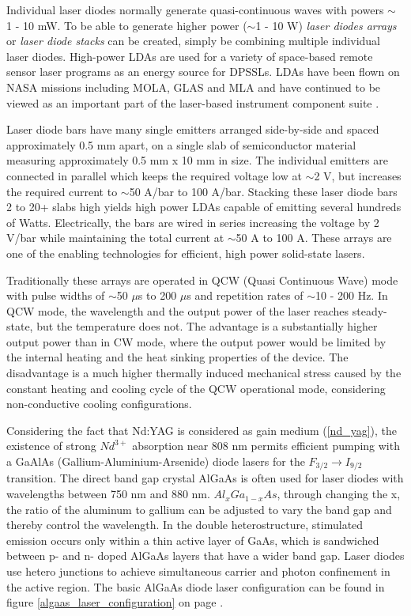 Individual \acs{laser} diodes normally generate quasi-continuous waves with powers $\sim$ 1 - 10 mW. To be able to generate higher power ($\sim$1 - 10 W) \textit{laser diodes arrays} or \textit{laser diode stacks} can be created, simply be combining multiple individual \acs{laser} diodes. High-power \acp{LDA} are used for a variety of space-based remote sensor laser programs as an energy source for \acp{DPSSL}. \acp{LDA} have been flown on NASA missions including MOLA, GLAS and MLA and have continued to be viewed as an important part of the \acs{laser}-based instrument component suite \cite{lda_main}. 

Laser diode bars have many single emitters arranged side-by-side and spaced approximately 0.5 mm apart, on a single slab of semiconductor material measuring approximately 0.5 mm x 10 mm in size. The individual emitters are connected in parallel which keeps the required voltage low at $\sim$2 V, but increases the required current to $\sim$50 A/bar to 100 A/bar. Stacking these laser diode bars 2 to 20+ slabs high yields high power \acp{LDA} capable of emitting several hundreds of Watts. Electrically, the bars are wired in series increasing the voltage by 2 V/bar while maintaining the total current at $\sim$50 A to 100 A. These arrays are one of the enabling technologies for efficient, high power solid-state lasers.

Traditionally these arrays are operated in QCW (Quasi Continuous Wave) mode with pulse widths of $\sim$50 $\mu$s to 200 $\mu$s and repetition rates of $\sim$10 - 200 Hz. In QCW mode, the wavelength and the output power of the laser reaches steady-state, but the temperature does not. The advantage is a substantially higher output power than in CW mode, where the output power would be limited by the internal heating and the heat sinking properties of the device. The disadvantage is a much higher thermally induced mechanical stress caused by the constant heating and cooling cycle of the QCW operational mode, considering non-conductive cooling configurations.

Considering the fact that Nd:YAG is considered as gain medium (\ref{nd_yag}), the existence of strong $Nd^{3+}$ absorption near 808 nm permits efficient pumping with a GaAlAs (Gallium-Aluminium-Arsenide) diode \acp{laser} for the $F_{3/2}\rightarrow I_{9/2}$ transition. The direct band gap crystal AlGaAs is often used for laser diodes with wavelengths between 750 nm and 880 nm. $Al_{x}Ga_{1-x}As$, through changing the x, the ratio of the aluminum to gallium can be adjusted to vary the band gap and thereby control the wavelength. In the double heterostructure, stimulated emission occurs only within a thin active layer of GaAs, which is sandwiched between p- and n- doped AlGaAs layers that have a wider band gap. Laser diodes use hetero junctions to achieve simultaneous carrier and photon confinement in the active region. The basic AlGaAs diode \acs{laser} configuration can be found in figure \ref{algaas_laser_configuration} on page \pageref{algaas_laser_configuration}.

